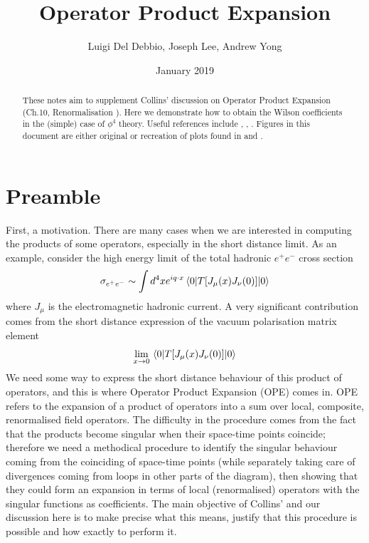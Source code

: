 \documentclass{article}
\title{Operator Product Expansion}
\author{Luigi Del Debbio, Joseph Lee, Andrew Yong}
\date{January 2019}
\begin{document}
\maketitle
\renewcommand{\abstractname}{\vspace{-\baselineskip}}
\begin{abstract}
These notes aim to supplement Collins' discussion on Operator Product Expansion (Ch.10, Renormalisation \cite{collins_1984}). Here we demonstrate how to obtain the Wilson coefficients in the (simple) case of $\phi^4$ theory. Useful references include \cite{schwartz}, \cite{Peskin:1995ev}, \cite{Bonneau:2009}. Figures in this document are either original or recreation of plots found in \cite{collins_1984} and \cite{weinberg}.
\end{abstract}

\section{Preamble}
First, a motivation. There are many cases when we are interested in computing the products of some operators, especially in the short distance limit. As an example, consider the high energy limit of the total hadronic $e^+ e^-$ cross section \cite{Bonneau:2009}
\begin{equation}
    \sigma_{e^+ e^-} \sim \int d^4x e^{iq\cdot x} \ev{T[J_\mu(x)J_\nu(0)]}{0}
\end{equation}
where $J_\mu$ is the electromagnetic hadronic current. A very significant contribution comes from the short distance expression of the vacuum polarisation matrix element 
\begin{equation}
    \lim_{x\rightarrow0} \ev{T[J_\mu(x)J_\nu(0)]}{0}
\end{equation}
We need some way to express the short distance behaviour of this product of operators, and this is where Operator Product Expansion (OPE) comes in. OPE refers to the expansion of a product of operators into a sum over local, composite, renormalised field operators. The difficulty in the procedure comes from the fact that the products become singular when their space-time points coincide; therefore we need a methodical procedure to identify the singular behaviour coming from the coinciding of space-time points (while separately taking care of divergences coming from loops in other parts of the diagram), then showing that they could form an expansion in terms of local (renormalised) operators with the singular functions as coefficients. The main objective of Collins' and our discussion here is to make precise what this means, justify that this procedure is possible and how exactly to perform it.
\end{document}
